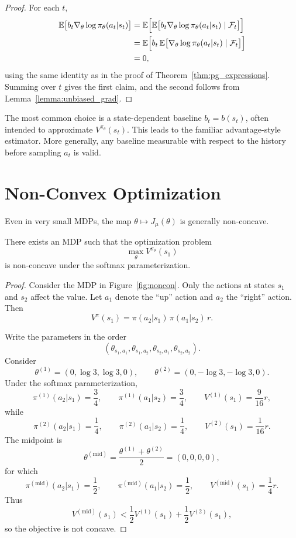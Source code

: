 \begin{proof}
For each $t$,
\begin{align*}
\mathbb{E}\big[b_t \nabla_\theta \log \pi_\theta(a_t|s_t)\big]
&=
\mathbb{E}\Big[\mathbb{E}\big[b_t \nabla_\theta \log \pi_\theta(a_t|s_t)\mid \mathcal{F}_t\big]\Big] \\
&=
\mathbb{E}\Big[b_t\,\mathbb{E}\big[\nabla_\theta \log \pi_\theta(a_t|s_t)\mid \mathcal{F}_t\big]\Big] \\
&= 0,
\end{align*}
using the same identity as in the proof of Theorem~\ref{thm:pg_expressions}.
Summing over $t$ gives the first claim, and the second follows from Lemma~\ref{lemma:unbiased_grad}.
\end{proof}

The most common choice is a state-dependent baseline $b_t=b(s_t)$, often intended to
approximate $V^{\pi_\theta}(s_t)$. This leads to the familiar advantage-style estimator.
More generally, any baseline measurable with respect to the history before sampling $a_t$
is valid.

\section{Non-Convex Optimization}

Even in very small MDPs, the map $\theta\mapsto J_\mu(\theta)$ is generally non-concave.



\begin{proposition}
\label{lemma:softmax-noncon}
There exists an MDP such that the optimization problem
\[
\max_\theta V^{\pi_\theta}(s_1)
\]
is non-concave under the softmax parameterization.
\end{proposition}

\begin{proof}
Consider the MDP in Figure~\ref{fig:noncon}. Only the actions at states $s_1$ and $s_2$
affect the value. Let $a_1$ denote the ``up'' action and $a_2$ the ``right'' action.
Then
\[
V^\pi(s_1)=\pi(a_2|s_1)\,\pi(a_1|s_2)\,r.
\]

Write the parameters in the order
\[
(\theta_{s_1,a_1},\theta_{s_1,a_2},\theta_{s_2,a_1},\theta_{s_2,a_2}).
\]
Consider
\[
\theta^{(1)}=(0,\log 3,\log 3,0),
\qquad
\theta^{(2)}=(0,-\log 3,-\log 3,0).
\]
Under the softmax parameterization,
\[
\pi^{(1)}(a_2|s_1)=\frac{3}{4},
\qquad
\pi^{(1)}(a_1|s_2)=\frac{3}{4},
\qquad
V^{(1)}(s_1)=\frac{9}{16}r,
\]
while
\[
\pi^{(2)}(a_2|s_1)=\frac{1}{4},
\qquad
\pi^{(2)}(a_1|s_2)=\frac{1}{4},
\qquad
V^{(2)}(s_1)=\frac{1}{16}r.
\]
The midpoint is
\[
\theta^{(\mathrm{mid})}=\frac{\theta^{(1)}+\theta^{(2)}}{2}=(0,0,0,0),
\]
for which
\[
\pi^{(\mathrm{mid})}(a_2|s_1)=\frac{1}{2},
\qquad
\pi^{(\mathrm{mid})}(a_1|s_2)=\frac{1}{2},
\qquad
V^{(\mathrm{mid})}(s_1)=\frac{1}{4}r.
\]
Thus
\[
V^{(\mathrm{mid})}(s_1)
<
\frac{1}{2}V^{(1)}(s_1)+\frac{1}{2}V^{(2)}(s_1),
\]
so the objective is not concave.
\end{proof}

